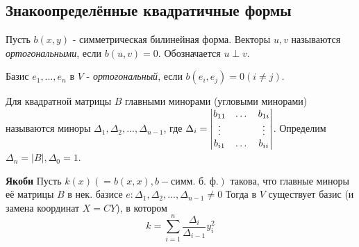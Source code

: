 \subsection{Знакоопределённые квадратичные формы}
\begin{definition}
    Пусть $b(x, y)$ - симметрическая билинейная форма. Векторы $u, v$ называются \textit{ортогональными}, если $b(u, v) = 0$. Обозначается $u \perp v$.
\end{definition}
\begin{definition} 
    Базис $e_1,...,e_n$ в $V$ - \textit{ортогональный}, если $b(e_i, e_j) = 0 (i \neq j)$.
\end{definition}
\begin{definition}
    Для квадратной матрицы $B$ главными минорами (угловыми минорами) называются миноры $\Delta_1,\Delta_2,...,\Delta_{n-1}$, где $\Delta_i = \begin{vmatrix} b_{11}&\dots&b_{1i}\\\vdots&\null&\vdots\\b_{i1}&\dots&b_{ii}\end{vmatrix}$. Определим $\Delta_n = |B|, \Delta_0 = 1$.
\end{definition}
\begin{theorem} \textbf{Якоби}
    Пусть $k(x) (= b(x, x), b - \text{симм. б. ф.})$ такова, что главные миноры её матрицы $B$ в нек. базисе $e: \Delta_1,\Delta_2,...,\Delta_{n-1} \neq 0$
    Тогда в $V$ существует базис (и замена координат $X = CY$), в котором 
    $$k = \sum \limits_{i=1}^{n} \frac{\Delta_i}{\Delta_{i-1}}y_i^2$$
\end{theorem}
